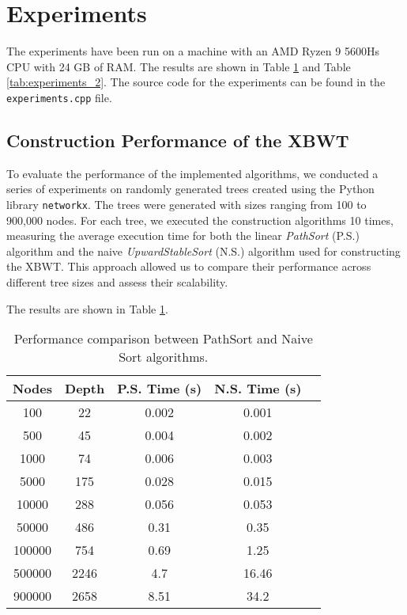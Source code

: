 \section{Experiments} 

The experiments have been run on a machine with an AMD Ryzen 9 5600Hs CPU with 24 GB of RAM. The results are shown in Table \ref{tab:experiments} and Table \ref{tab:experiments_2}. The source code for the experiments can be found in the \texttt{experiments.cpp} file.

\subsection{Construction Performance of the XBWT}
To evaluate the performance of the implemented algorithms, we conducted a series of experiments on randomly generated trees created using the Python library \texttt{networkx}. The trees were generated with sizes ranging from 100 to 900,000 nodes. For each tree, we executed the construction algorithms 10 times, measuring the average execution time for both the linear \emph{PathSort} (P.S.) algorithm and the naive \emph{UpwardStableSort} (N.S.) algorithm used for constructing the XBWT. This approach allowed us to compare their performance across different tree sizes and assess their scalability.


The results are shown in Table \ref{tab:experiments}.

\begin{table}[h]
    \centering
    \begin{tabular}{|c|c|c|c|c|}
        \hline
        \textbf{Nodes} & \textbf{Depth} & \textbf{P.S. Time (s)} & \textbf{N.S. Time (s)} \\
        \hline
        100 & 22 & 0.002 & 0.001 \\
        500 & 45 & 0.004 & 0.002  \\
        1000 & 74 & 0.006 & 0.003  \\
        5000 & 175 & 0.028 & 0.015 \\
        10000 & 288 & 0.056 & 0.053 \\
        50000 & 486 & 0.31 & 0.35 \\
        100000 & 754 & 0.69 & 1.25\\
        500000 & 2246 & 4.7 & 16.46 \\
        900000 & 2658 & 8.51 & 34.2 \\
        \hline
    \end{tabular}
    \caption{Performance comparison between PathSort and Naive Sort algorithms.}
    \label{tab:experiments}
\end{table}

